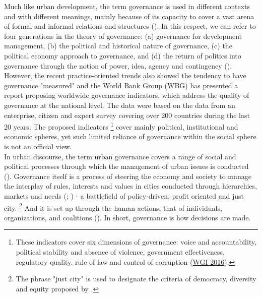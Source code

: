 \documentclass[11pt]{report}
\begin{document}
{{{Much like urban development, the term governance is used in different contexts and with different meanings, mainly because of its capacity to cover a vast arena of formal and informal relations and structures (\href{Pierre}{\citealt{pierre_governance_2000}}).
In this respect, we can refer to four generations in the theory of governance: 
(a) governance for development management,
(b) the political and historical nature of governance,
(c) the political economy approach to governance,
and
(d) the return of politics into governance through the notion of power, idea, agency and contingency (\href{Hudson}{\citealt{hudson_political_2014}}).
However, the recent practice-oriented trends also showed the tendency to have governance "measured" and the World Bank Group (WBG) has presented a report proposing worldwide governance indicators, which address the quality of governance at the national level. The data were based on the data from an enterprise, citizen and expert survey covering over 200 countries during the last 20 years. The proposed indicators 
\footnote{These indicators cover six dimensions of governance: voice and accountability, political stability and absence of violence, government effectiveness, regulatory quality, rule of law and control of corruption (\href{wgi}{WGI 2016}).}
cover mainly political, institutional and economic spheres, yet such limited reliance of governance within the social sphere is not an official view.
\\

In urban discourse, the term urban governance covers a range of social and political processes through which the management of urban issues is conducted (\href{Healey}{\citealt{healey_collaborative_1997}}).
Governance itself is a process of steering the economy and society to manage the interplay of rules, interests and values in cities conducted through hierarchies, markets and needs (\href{Pierre}{\citealt{pierre_debating_2000}}; \href{Pierre}{\citealt{pierre_governance_2000}}) - a battlefield of policy-driven, profit oriented and just city.
\footnote{The phrase "just city" is used to designate the criteria of democracy, diversity and equity proposed by  \href{Farnstein}{\cite{fainstein_just_2010}}.}
And it is set up through the human actions, that of individuals, organizations, and coalitions (\href{Hudson}{\citealt{hudson_political_2014}}).
In short, governance is how decisions are made.
\\

}}}
\end{document}
